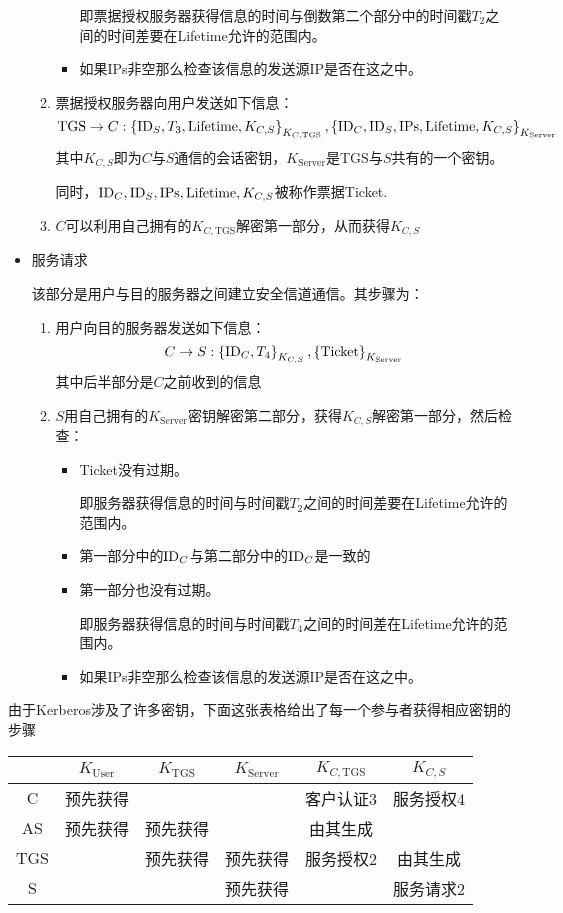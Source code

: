 \begin{itemize}
\begin{enumerate}
\begin{itemize}
			即票据授权服务器获得信息的时间与倒数第二个部分中的时间戳$T_2$之间的时间差要在Lifetime允许的范围内。
			\item 如果IPs非空那么检查该信息的发送源IP是否在这之中。
		\end{itemize}
		\item 票据授权服务器向用户发送如下信息：
		\[\mathrm{TGS}\to C: \left\{ {\mathrm{ID}_S, T_3, \mathrm{Lifetime}, K_{C, S}} \right\}_{K_{C, \mathrm{TGS}}}, \left\{ {\mathrm{ID}_C, \mathrm{ID}_S, \mathrm{IPs}, \mathrm{Lifetime}, K_{C, S}} \right\}_{K_{\mathrm{Server}}}\]
		其中$K_{C, S}$即为$C$与$S$通信的会话密钥，$K_{\mathrm{Server}}$是TGS与$S$共有的一个密钥。\par
		同时，$\mathrm{ID}_C, \mathrm{ID}_S, \mathrm{IPs}, \mathrm{Lifetime}, K_{C, S}$被称作票据Ticket.
		\item $C$可以利用自己拥有的$K_{C, \mathrm{TGS}}$解密第一部分，从而获得$K_{C, S}$
	\end{enumerate}
	\item 服务请求\par
	该部分是用户与目的服务器之间建立安全信道通信。其步骤为：
	\begin{enumerate}
		\item 用户向目的服务器发送如下信息：
		\[C\to S: \left\{ {\mathrm{ID}_C, T_4} \right\}_{K_{C, S}}, \left\{ {\mathrm{Ticket}} \right\}_{K_{\mathrm{Server}}}\]
		其中后半部分是$C$之前收到的信息
		\item $S$用自己拥有的$K_{\mathrm{Server}}$密钥解密第二部分，获得$K_{C, S}$解密第一部分，然后检查：
		\begin{itemize}
			\item Ticket没有过期。\par
			即服务器获得信息的时间与时间戳$T_2$之间的时间差要在Lifetime允许的范围内。
			\item 第一部分中的$\mathrm{ID}_C$与第二部分中的$\mathrm{ID}_C$是一致的
			\item 第一部分也没有过期。\par
			即服务器获得信息的时间与时间戳$T_4$之间的时间差在Lifetime允许的范围内。
			\item 如果IPs非空那么检查该信息的发送源IP是否在这之中。
		\end{itemize}
	\end{enumerate}	
\end{itemize}

由于Kerberos涉及了许多密钥，下面这张表格给出了每一个参与者获得相应密钥的步骤
\begin{table}[H]
\centering
\begin{tabular}{c|c|c|c|c|c}\hline
&$K_{\mathrm{User}}$&$K_{\mathrm{TGS}}$&$K_{\mathrm{Server}}$&$K_{C, \mathrm{TGS}}$&$K_{C, S}$\\\hline
C&预先获得&&&客户认证3&服务授权4\\\hline
AS&预先获得&预先获得&&由其生成&\\\hline
TGS&&预先获得&预先获得&服务授权2&由其生成\\\hline
S&&&预先获得&&服务请求2\\\hline
\end{tabular}
\end{table}